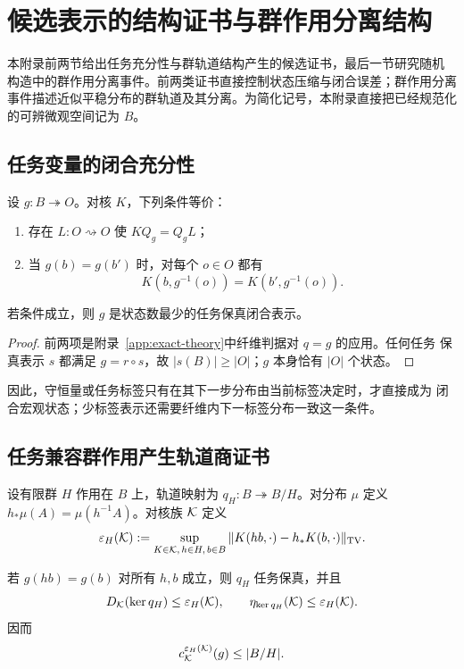 \section{候选表示的结构证书与群作用分离结构}
\label{app:structural-certificates}

本附录前两节给出任务充分性与群轨道结构产生的候选证书，最后一节研究随机
构造中的群作用分离事件。前两类证书直接控制状态压缩与闭合误差；群作用分离
事件描述近似平稳分布的群轨道及其分离。为简化记号，本附录直接把已经规范化
的可辨微观空间记为 $B$。

\subsection{任务变量的闭合充分性}

\begin{proposition}[任务充分性]
\label{prop:task-sufficiency}
设 $g:B\twoheadrightarrow O$。对核 $K$，下列条件等价：
\begin{enumerate}
  \item 存在 $L:O\rightsquigarrow O$ 使 $KQ_g=Q_gL$；
  \item 当 $g(b)=g(b')$ 时，对每个 $o\in O$ 都有
  \[
  K(b,g^{-1}(o))=K(b',g^{-1}(o)).
  \]
\end{enumerate}
若条件成立，则 $g$ 是状态数最少的任务保真闭合表示。
\end{proposition}

\begin{proof}
前两项是附录~\ref{app:exact-theory}中纤维判据对 $q=g$ 的应用。任何任务
保真表示 $s$ 都满足 $g=r\circ s$，故 $|s(B)|\ge|O|$；$g$ 本身恰有
$|O|$ 个状态。
\end{proof}

因此，守恒量或任务标签只有在其下一步分布由当前标签决定时，才直接成为
闭合宏观状态；少标签表示还需要纤维内下一标签分布一致这一条件。

\subsection{任务兼容群作用产生轨道商证书}

设有限群 $H$ 作用在 $B$ 上，轨道映射为
$q_H:B\twoheadrightarrow B/H$。对分布 $\mu$ 定义
$h_*\mu(A)=\mu(h^{-1}A)$。对核族 $\mathcal K$ 定义
\[
\varepsilon_H(\mathcal K)
:=
\sup_{K\in\mathcal K,\,h\in H,\,b\in B}
\|K(hb,\cdot)-h_*K(b,\cdot)\|_{\operatorname{TV}}.
\]

\begin{theorem}[群轨道闭合证书]
\label{thm:symmetry-certificate-app}
若 $g(hb)=g(b)$ 对所有 $h,b$ 成立，则 $q_H$ 任务保真，并且
\[
D_{\mathcal K}(\ker q_H)
\le \varepsilon_H(\mathcal K),
\qquad
\eta_{\ker q_H}(\mathcal K)
\le \varepsilon_H(\mathcal K).
\]
因而
\[
c_{\mathcal K}^{\varepsilon_H(\mathcal K)}(g)\le |B/H|.
\]
\end{theorem}

